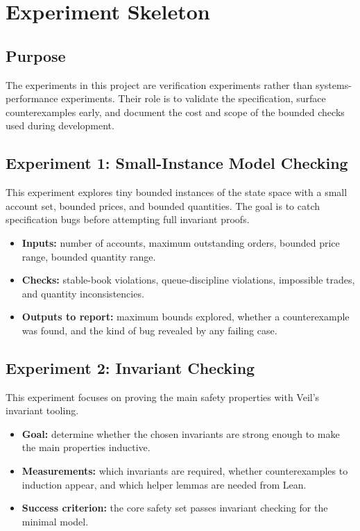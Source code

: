 \section{Experiment Skeleton}

\subsection{Purpose}

The experiments in this project are verification experiments rather than
systems-performance experiments. Their role is to validate the specification,
surface counterexamples early, and document the cost and scope of the bounded
checks used during development.

\subsection{Experiment 1: Small-Instance Model Checking}

This experiment explores tiny bounded instances of the state space with a small
account set, bounded prices, and bounded quantities. The goal is to catch
specification bugs before attempting full invariant proofs.

\begin{itemize}[leftmargin=1.5em]
\item \textbf{Inputs:} number of accounts, maximum outstanding orders, bounded
price range, bounded quantity range.
\item \textbf{Checks:} stable-book violations, queue-discipline violations,
impossible trades, and quantity inconsistencies.
\item \textbf{Outputs to report:} maximum bounds explored, whether a
counterexample was found, and the kind of bug revealed by any failing case.
\end{itemize}

\subsection{Experiment 2: Invariant Checking}

This experiment focuses on proving the main safety properties with Veil's
invariant tooling.

\begin{itemize}[leftmargin=1.5em]
\item \textbf{Goal:} determine whether the chosen invariants are strong enough
to make the main properties inductive.
\item \textbf{Measurements:} which invariants are required, whether
counterexamples to induction appear, and which helper lemmas are needed from
Lean.
\item \textbf{Success criterion:} the core safety set passes invariant
checking for the minimal model.
\end{itemize}

